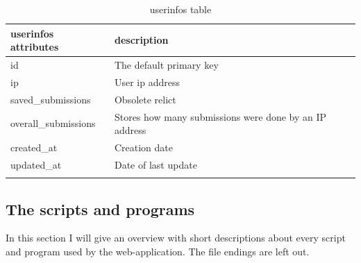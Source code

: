 \documentclass{scrartcl}
\begin{document}
		\begin{table}[]
			\caption{userinfos table}
			\label{tab:userinfos}
			\begin{tabular}[c]{l|l}
				\hline \textbf{userinfos attributes} & \textbf{description} \\	
				\hline id & The default primary key \\
				ip & User ip address \\
				saved\_submissions & Obsolete relict\\
				overall\_submissions & Stores how many submissions were done by an IP address\\
				created\_at & Creation date\\
				updated\_at & Date of last update\\
				\\\hline
			\end{tabular}
		\end{table}		
		
		
		\subsection{The scripts and programs}
			In this section I will give an overview with short descriptions about every script and program used by the web-application. The file endings are left out.
			
\end{document}

